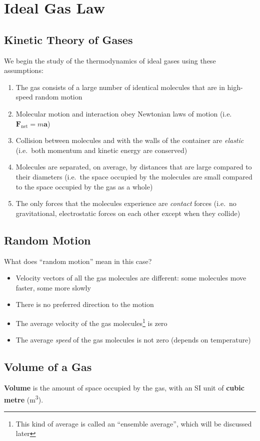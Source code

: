 \section{Ideal Gas Law}

\subsection{Kinetic Theory of Gases}
We begin the study of the thermodynamics of ideal gases using these assumptions:
\begin{enumerate}
\item The gas consists of a large number of identical molecules that are in
  high-speed random motion
\item Molecular motion and interaction obey Newtonian laws of motion (i.e.\
  $\bm F_\text{net}=m\bm a$)
\item Collision between molecules and with the walls of the container are
  \emph{elastic} (i.e.\ both momentum and kinetic energy are conserved)
\item Molecules are separated, on average, by distances that are large
  compared to their diameters (i.e.\ the space occupied by the molecules are
  small compared to the space occupied by the gas as a whole)
\item The only forces that the molecules experience are \emph{contact} forces
  (i.e.\ no gravitational, electrostatic forces on each other except when
  they collide)
\end{enumerate}
%
%
%
%
\subsection{Random Motion}
What does ``random motion'' mean in this case?
\begin{itemize}
\item Velocity vectors of all the gas molecules are different: some molecules
  move faster, some more slowly
\item There is no preferred direction to the motion
\item The average velocity of the gas molecules\footnote{This kind of average
is called an ``ensemble average'', which will be discussed later} is zero
\item The average \emph{speed} of the gas molecules is not zero (depends on
  temperature)
\end{itemize}


\subsection{Volume of a Gas}
\textbf{Volume} is the amount of space occupied by the gas, with an SI unit of
\textbf{cubic metre} (\si{\metre\cubed}).
%
%
%
%
